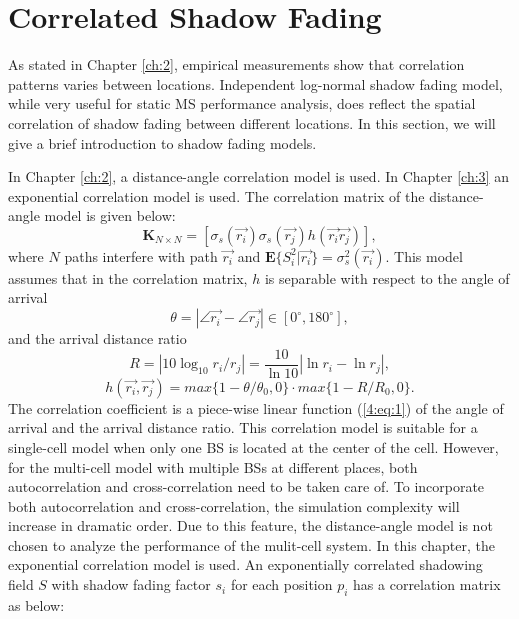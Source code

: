  \section{Correlated Shadow Fading}
 \label{4:CorrShadowField}
 As stated in Chapter \ref{ch:2}, empirical measurements show that correlation patterns varies between locations. Independent log-normal shadow fading model, while very useful for static MS performance analysis, does reflect the spatial correlation of shadow fading between different locations. In this section, we will give a brief introduction to shadow fading models.
 
 In Chapter \ref{ch:2}, a distance-angle correlation model is used. In Chapter \ref{ch:3} an exponential correlation model is used. The correlation matrix of the distance-angle model is given below:
 \begin{equation}
 \mathbf{K}_{N\times N} = [ \sigma_{s}(\vec{r_{i}})\sigma_{s}(\vec{r_{j}})h(\vec{r_{i}}\vec{r_{j}})],
 \label{4:correlationmatrix}
 \end{equation}
 where $N$ paths interfere with path $\vec{r_{i}}$ and $\mathbf{E}\{S_{i}^{2}|\vec{r_{i}}\}=\sigma_{s}^{2}(\vec{r_{i}})$. This model assumes that in the correlation matrix, $h$ is separable with respect to the angle of arrival
 \begin{equation}
 \theta = |\angle\vec{r_{i}}-\angle\vec{r_{j}}|\in [0^{\circ},180^{\circ}],
 \end{equation}
 and the arrival distance ratio
 \begin{equation}
 R=|10\log_{10}r_{i}/r_{j}|=\frac{10}{\ln 10}|\ln r_{i}-\ln r_{j}|,
 \end{equation}
 \begin{equation}
 h(\vec{r_{i}},\vec{r_{j}})=max\{1-\theta/\theta_{0},0\}\cdot max\{1-R/R_{0},0\}.
 \label{4:eq:1}
 \end{equation}
 The correlation coefficient is a piece-wise linear function (\ref{4:eq:1}) of the angle of arrival and the arrival distance ratio. This correlation model is suitable for a single-cell model when only one BS is located at the center of the cell. However, for the multi-cell model with multiple BSs at different places, both autocorrelation and cross-correlation need to be taken care of. To incorporate both autocorrelation and cross-correlation, the simulation complexity will increase in dramatic order. Due to this feature, the distance-angle model is not chosen to analyze the performance of the mulit-cell system. In this chapter, the exponential correlation model is used. An exponentially correlated shadowing field $S$ with shadow fading factor $s_{i}$ for each position $p_{i}$ has a correlation matrix as below:
